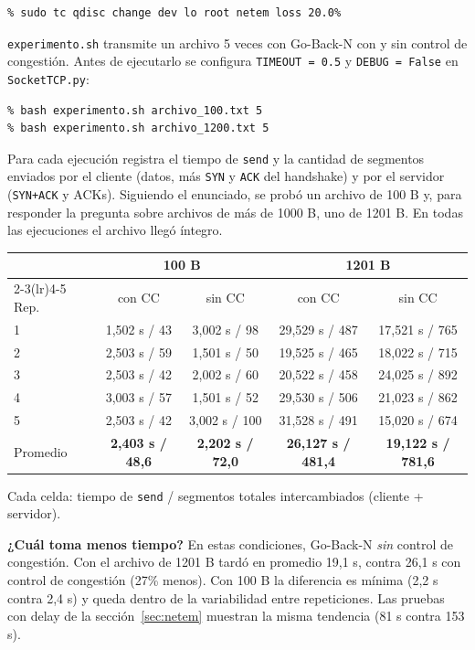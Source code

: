 \documentclass[11pt,letterpaper]{article}
\begin{document}
\begin{lstlisting}
% sudo tc qdisc change dev lo root netem loss 20.0%
\end{lstlisting}

\texttt{experimento.sh} transmite un archivo 5 veces con Go-Back-N con y sin control de
congestión. Antes de ejecutarlo se configura \texttt{TIMEOUT = 0.5} y
\texttt{DEBUG = False} en \texttt{SocketTCP.py}:

\begin{lstlisting}
% bash experimento.sh archivo_100.txt 5
% bash experimento.sh archivo_1200.txt 5
\end{lstlisting}

Para cada ejecución registra el tiempo de \texttt{send} y la cantidad de segmentos
enviados por el cliente (datos, más \texttt{SYN} y \texttt{ACK} del handshake) y por el
servidor (\texttt{SYN+ACK} y ACKs). Siguiendo el enunciado, se probó un archivo de 100 B
y, para responder la pregunta sobre archivos de más de 1000 B, uno de 1201 B. En todas
las ejecuciones el archivo llegó íntegro.

\begin{center}
\begin{tabular}{@{}lcccc@{}}
  \toprule
  & \multicolumn{2}{c}{100 B} & \multicolumn{2}{c}{1201 B} \\
  \cmidrule(lr){2-3}\cmidrule(lr){4-5}
  Rep. & con CC & sin CC & con CC & sin CC \\
  \midrule
  1 & 1,502 s / 43 & 3,002 s / 98 & 29,529 s / 487 & 17,521 s / 765 \\
  2 & 2,503 s / 59 & 1,501 s / 50 & 19,525 s / 465 & 18,022 s / 715 \\
  3 & 2,503 s / 42 & 2,002 s / 60 & 20,522 s / 458 & 24,025 s / 892 \\
  4 & 3,003 s / 57 & 1,501 s / 52 & 29,530 s / 506 & 21,023 s / 862 \\
  5 & 2,503 s / 42 & 3,002 s / 100 & 31,528 s / 491 & 15,020 s / 674 \\
  \midrule
  Promedio & \textbf{2,403 s / 48,6} & \textbf{2,202 s / 72,0} & \textbf{26,127 s / 481,4} & \textbf{19,122 s / 781,6} \\
  \bottomrule
\end{tabular}

\smallskip
{\footnotesize Cada celda: tiempo de \texttt{send} / segmentos totales intercambiados
(cliente + servidor).}
\end{center}

\textbf{¿Cuál toma menos tiempo?} En estas condiciones, Go-Back-N \emph{sin} control de
congestión. Con el archivo de 1201 B tardó en promedio 19,1 s, contra 26,1 s con control
de congestión (27\% menos). Con 100 B la diferencia es mínima (2,2 s contra 2,4 s) y queda
dentro de la variabilidad entre repeticiones. Las pruebas con delay de la
sección~\ref{sec:netem} muestran la misma tendencia (81 s contra 153 s).
\end{document}
